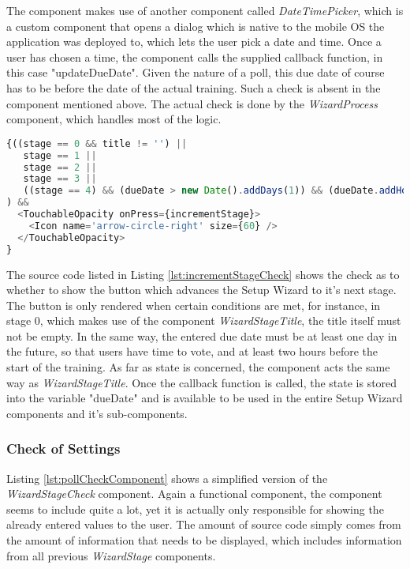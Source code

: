 The component makes use of another component called \textit{DateTimePicker}, which is a custom component that opens a dialog which is native to the mobile OS the application was deployed to, which lets the user pick a date and time. Once a user has chosen a time, the component calls the supplied callback function, in this case "updateDueDate".
\newline
Given the nature of a poll, this due date of course has to be before the date of the actual training. Such a check is absent in the component mentioned above. The actual check is done by the \textit{WizardProcess} component, which handles most of the logic.

\begin{lstlisting}[language=javascript,caption=Increment Stage Check,label=lst:incrementStageCheck]
{((stage == 0 && title != '') ||
   stage == 1 ||
   stage == 2 ||
   stage == 3 ||
   ((stage == 4) && (dueDate > new Date().addDays(1)) && (dueDate.addHours(2) < trainingDate))
) &&
  <TouchableOpacity onPress={incrementStage}>
    <Icon name='arrow-circle-right' size={60} />
  </TouchableOpacity>
}
\end{lstlisting}

The source code listed in Listing \ref{lst:incrementStageCheck} shows the check as to whether to show the button which advances the Setup Wizard to it's next stage. The button is only rendered when certain conditions are met, for instance, in stage 0, which makes use of the component \textit{WizardStageTitle}, the title itself must not be empty. In the same way, the entered due date must be at least one day in the future, so that users have time to vote, and at least two hours before the start of the training.
\newline
As far as state is concerned, the component acts the same way as \textit{WizardStageTitle}. Once the callback function is called, the state is stored into the variable "dueDate" and is available to be used in the entire Setup Wizard components and it's sub-components.

\subsubsection{Check of Settings}
\label{sssec:poll_check}

Listing \ref{lst:pollCheckComponent} shows a simplified version of the \textit{WizardStageCheck} component. Again a functional component, the component seems to include quite a lot, yet it is actually only responsible for showing the already entered values to the user. The amount of source code simply comes from the amount of information that needs to be displayed, which includes information from all previous \textit{WizardStage} components.

